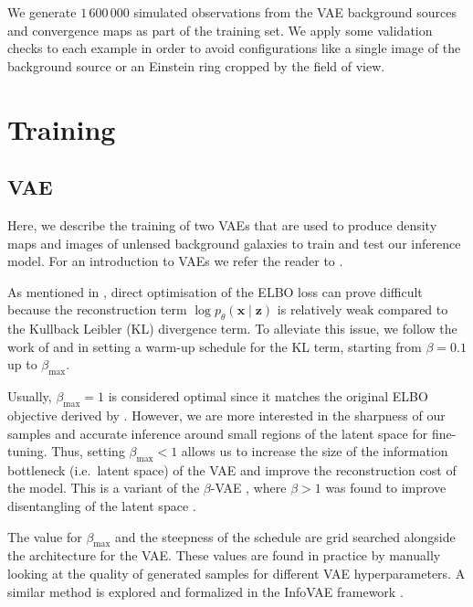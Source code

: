 We generate $1\,600\,000$ simulated observations from the VAE 
background sources and convergence maps as part of the training set. We apply some validation checks to each example in order to avoid configurations like a single image of the background source or an Einstein ring cropped by the field of view.




\section{Training}\label{sec:training}

\subsection{VAE}\label{sec:vae training}
Here, we describe the training of two VAEs that are used to produce density maps and images of unlensed background galaxies to train and test our inference model. For an introduction to VAEs we refer the reader to \citet{Kingma2019}.

As mentioned in \citet{Kingma2019}, direct optimisation 
of the ELBO loss can prove difficult because the reconstruction term $\log p_\theta (\mathbf{x} \mid \mathbf{z})$ 
is relatively weak compared to the Kullback Leibler (KL) divergence term. To alleviate this issue, 
we follow the work of \citet{Bowman2015} and \citet{Sonderby2016} in setting a warm-up 
schedule for the KL term, starting from $\beta=0.1$ up to $\beta_{\mathrm{max}}$. 

Usually, 
$\beta_{\mathrm{max}} = 1$ is considered optimal since it matches the original ELBO  
objective derived by \citet{Kingma2013}. 
However, we are more interested in the 
sharpness of our samples and accurate inference around small regions of the latent 
space for fine-tuning. Thus, setting $\beta_{\mathrm{max}} < 1$ allows us to increase 
the size of the information bottleneck (i.e.~latent space) of the VAE 
and improve the reconstruction cost of the model. 
This is a variant of the $\beta$-VAE \citep{Higgins2017}, where $\beta > 1$ was found 
to improve disentangling of the latent space \citep{Burgess2018}. 

The value for $\beta_\mathrm{max}$ and the steepness of the schedule 
are grid searched alongside the architecture for the VAE. 
These values are found in practice by 
manually looking at the quality of generated samples for different VAE 
hyperparameters. A similar method is explored and formalized in the 
InfoVAE framework \citep{Zhao2017}.


